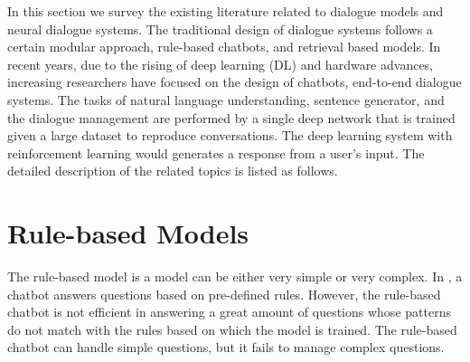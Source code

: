 In this section we survey the existing literature related to dialogue models and neural dialogue systems. 
The traditional design of dialogue systems follows a certain modular approach, rule-based chatbots, and retrieval based models. 
In recent years, due to the rising of deep learning (DL) and hardware advances, increasing researchers have focused on the design of chatbots, end-to-end dialogue systems. The tasks of natural language understanding, sentence generator, and the dialogue management are performed by a single deep network that is trained given a large dataset to reproduce conversations. The deep learning system with reinforcement learning would generates a response from a user’s input. The detailed description of the related topics is listed as follows. 
\section{Rule-based Models} \label{subsubsec:Rule-based Modelsg}
The rule-based model is a model can be either very simple or very complex. In \cite{Webb00rule-baseddialogue}, a chatbot answers questions based on pre-defined rules. However, the rule-based chatbot is not efficient in answering a great amount of questions whose patterns do not match with the rules based on which the model is trained. The rule-based chatbot can handle simple questions, but it fails to manage complex questions.
